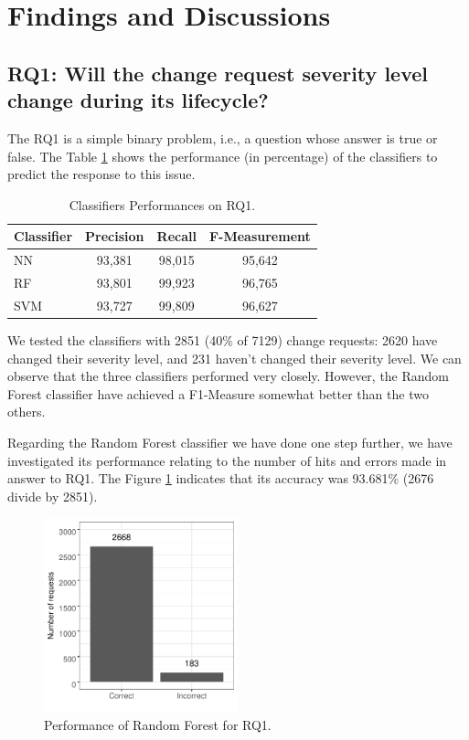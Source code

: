 \documentclass[10pt, conference]{IEEEtran}
\begin{document}
\section{Findings and Discussions}  \label{sec:discussion}

\subsection{RQ1: Will the change request severity level change during its lifecycle?}

The RQ1 is a simple binary problem, i.e., a question whose answer is true or false. The Table \ref{tab:metrics_for_rq1} shows the performance (in percentage) of the classifiers to predict the response to this issue.

\begin{table}[!ht]
	\renewcommand{\arraystretch}{1.3}
	\caption{Classifiers Performances on RQ1.}
	\label{tab:metrics_for_rq1}
	\centering
	\begin{tabular}{|l|c|c|c|}
		\hline
		Classifier & Precision & Recall & F-Measurement\\
		\hline 
		NN & 93,381 & 98,015 & 95,642\\
		\hline
		RF & 93,801 & 99,923 & 96,765\\
        \hline
		SVM & 93,727 & 99,809 & 96,627 \\
		\hline
		
	\end{tabular}
\end{table}

We tested the classifiers with 2851 (40\% of 7129) change requests: 2620 have changed their severity level, and 231 haven't changed their severity level. We can observe that the three classifiers performed very closely. However, the Random Forest classifier have achieved a F1-Measure somewhat better than the two others.

Regarding the Random Forest classifier we have done one step further, we have investigated its performance relating to the number of hits and errors made in answer to RQ1. The Figure \ref{fig:rf_performance_for_q1} indicates that its accuracy was 93.681\% (2676 divide by 2851). 

\begin{figure}[!hbt]
  \label{fig:rf_performance_for_q1}
  \includegraphics[width=0.5\textwidth, height=0.42\textwidth]{figures/rf_performance_for_q1.pdf}
  \caption{Performance of Random Forest for RQ1.}
\end{figure}
\end{document}
